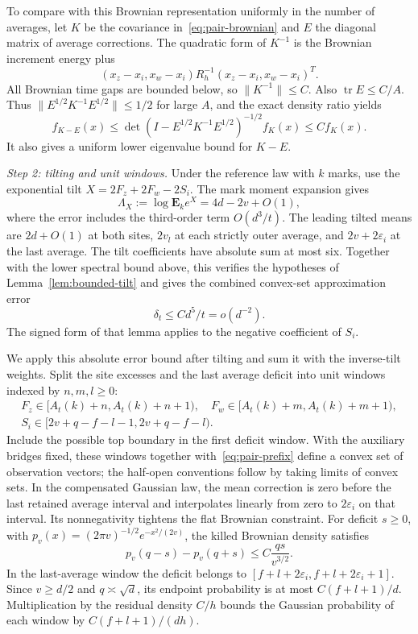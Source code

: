\documentclass[11pt,letterpaper,reqno]{amsart}
\newif\ifrevmarks \revmarkstrue
\newcommand{\add}[1]{\ifrevmarks\textcolor{revorange}{#1}\else#1\fi}
\numberwithin{equation}{section}
\theoremstyle{remark}
\begin{document}
To compare with this Brownian representation uniformly in the number of averages, let $K$ be the covariance in~\eqref{eq:pair-brownian} and $E$ the diagonal matrix of average corrections. The quadratic form of $K^{-1}$ is the Brownian increment energy plus
\[
 (x_z-x_i,x_w-x_i)R_h^{-1}(x_z-x_i,x_w-x_i)^T.
\]
All Brownian time gaps are bounded below, so $\|K^{-1}\|\le C$. Also $\operatorname{tr}E\le C/A$. Thus $\|E^{1/2}K^{-1}E^{1/2}\|\le1/2$ for large $A$, and the exact density ratio yields
\begin{equation}\label{eq:pair-density}
 f_{K-E}(x)\le\det(I-E^{1/2}K^{-1}E^{1/2})^{-1/2}f_K(x)
 \le C f_K(x).
\end{equation}
It also gives a uniform lower eigenvalue bound for $K-E$.

\add{\emph{Step 2: tilting and unit windows.}} Under the reference law with $k$ marks, use the exponential tilt $X=2F_z+2F_w-2S_i$. The mark moment expansion gives
\begin{equation}\label{eq:9.2}
 \Lambda_X:=\log\mathbf E_ke^X=4d-2v+O(1),
\end{equation}
where the error includes the third-order term $O(d^3/t)$. The leading tilted means are $2d+O(1)$ at both sites, $2v_l$ at each strictly outer average, and $2v+2\varepsilon_i$ at the last average. The tilt coefficients have absolute sum at most six. Together with the lower spectral bound above, this verifies the hypotheses of Lemma~\ref{lem:bounded-tilt} and gives the combined convex-set approximation error
\begin{equation}\label{eq:pair-clt}
 \delta_t\le Cd^5/t=o(d^{-2}).
\end{equation}
The signed form of that lemma applies to the negative coefficient of $S_i$.

We apply this absolute error bound after tilting and sum it with the inverse-tilt weights. Split the site excesses and the last average deficit into unit windows indexed by $n,m,l\ge0$:
\begin{equation}\label{eq:pair-windows}
\begin{gathered}
 F_z\in[A_t(k)+n,A_t(k)+n+1),\quad
 F_w\in[A_t(k)+m,A_t(k)+m+1),\\
 S_i\in[2v+q-f-l-1,2v+q-f-l).
\end{gathered}
\end{equation}
Include the possible top boundary in the first deficit window. With the auxiliary bridges fixed, these windows together with~\eqref{eq:pair-prefix} define a convex set of observation vectors; the half-open conventions follow by taking limits of convex sets. In the compensated Gaussian law, the mean correction is zero before the last retained average interval and interpolates linearly from zero to $2\varepsilon_i$ on that interval. Its nonnegativity tightens the flat Brownian constraint. For deficit $s\ge0$, with $p_v(x)=(2\pi v)^{-1/2}e^{-x^2/(2v)}$, the killed Brownian density satisfies
\[
 p_v(q-s)-p_v(q+s)\le C\frac{qs}{v^{3/2}}.
\]
In the last-average window the deficit belongs to
$[f+l+2\varepsilon_i,f+l+2\varepsilon_i+1]$. Since $v\ge d/2$ and $q\asymp\sqrt d$, its endpoint probability is at most $C(f+l+1)/d$.
Multiplication by the residual density $C/h$ bounds the Gaussian probability of each window by $C(f+l+1)/(dh)$.
\end{document}
